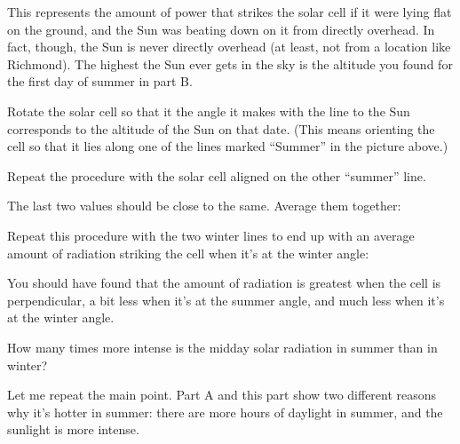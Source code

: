 \answerspace{0.25in}

This represents the amount of power that strikes the solar cell
if it were lying flat on the ground, and the Sun was beating down
on it from directly overhead. In fact, though, the Sun is never
directly overhead (at least, not from a location like Richmond).
The highest the Sun ever gets in the sky is the altitude you found
for the first day of summer in part B.

Rotate the solar cell so that it the angle it makes with
the line to the Sun corresponds to the altitude of the
Sun on that date. (This means orienting the cell so that it
lies along one of the lines marked ``Summer'' in the picture above.)

\pagebreak[2]

\answerspace{1in}

Repeat the procedure with the solar cell aligned on the other ``summer''
line.  

\answerspace{1in}

The last two values should be close to the same.  Average them
together:

\answerspace{1in}

Repeat this procedure with the two winter lines to end
up with an average amount of radiation striking the cell
when it's at the winter angle:

\answerspace{2in}

You should have found that the amount of radiation is greatest
when the cell is perpendicular, a bit less when it's at the summer
angle, and much less when it's at the winter angle.

How many times more intense is the midday solar radiation in summer
than in winter?

\answerspace{1in}

Let me repeat the main point. Part A and this part 
show two different reasons why it's hotter in summer: there are more
hours of daylight in summer, and the sunlight is more intense.



